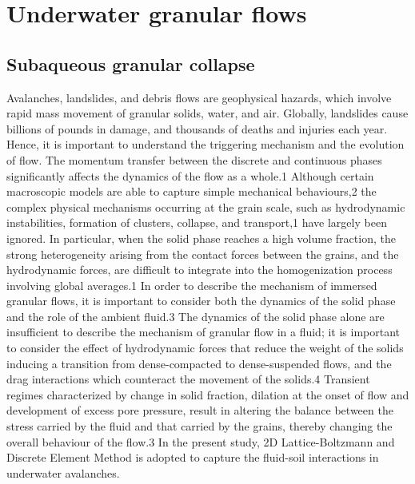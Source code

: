\chapter{Underwater granular flows}

\ifpdf
    \graphicspath{{Chapter6/figs/raster/}{Chapter6/figs/pdf/}{Chapter6/figs/}}
\else
    \graphicspath{{Chapter6/figs/vector/}{Chapter6/figs/}}
\fi

\section{Subaqueous granular collapse}

Avalanches, landslides, and debris flows are geophysical hazards, which involve 
rapid mass movement of granular solids, water, and air. Globally, landslides 
cause billions of pounds in damage, and thousands of deaths and injuries each 
year. Hence, it is important to understand the triggering mechanism and the 
evolution of flow. The momentum transfer between the discrete and continuous 
phases significantly affects the dynamics of the flow as a whole.1 Although 
certain macroscopic models are able to capture simple mechanical behaviours,2 
the complex physical mechanisms occurring at the grain scale, such as 
hydrodynamic instabilities, formation of clusters, collapse, and transport,1 
have largely been ignored. In particular, when the solid phase reaches a high 
volume fraction, the strong heterogeneity arising from the contact forces 
between the grains, and the hydrodynamic forces, are difficult to integrate 
into the homogenization process involving global averages.1 In order to 
describe the mechanism of immersed granular flows, it is important to consider 
both the dynamics of the solid phase and the role of the ambient fluid.3 The 
dynamics of the solid phase alone are insufficient to describe the mechanism of 
granular flow in a fluid; it is important to consider the effect of 
hydrodynamic forces that reduce the weight of the solids inducing a transition 
from dense-compacted to dense-suspended flows, and the drag interactions which 
counteract the movement of the solids.4 Transient regimes characterized by 
change in solid fraction, dilation at the onset of flow and development of 
excess pore pressure, result in altering the balance between the stress carried 
by the fluid and that carried by the grains, thereby changing the overall 
behaviour of the flow.3 In the present study, 2D Lattice-Boltzmann and Discrete 
Element Method is adopted to capture the fluid-soil interactions in underwater 
avalanches.


